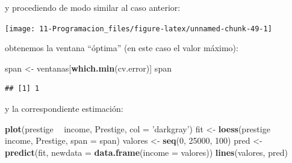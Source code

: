 \documentclass[]{book}
\newenvironment{Shaded}{\begin{snugshade}}{\end{snugshade}}
\newcommand{\KeywordTok}[1]{\textcolor[rgb]{0.13,0.29,0.53}{\textbf{#1}}}
\newcommand{\DataTypeTok}[1]{\textcolor[rgb]{0.13,0.29,0.53}{#1}}
\newcommand{\DecValTok}[1]{\textcolor[rgb]{0.00,0.00,0.81}{#1}}
\newcommand{\FloatTok}[1]{\textcolor[rgb]{0.00,0.00,0.81}{#1}}
\newcommand{\StringTok}[1]{\textcolor[rgb]{0.31,0.60,0.02}{#1}}
\newcommand{\CommentTok}[1]{\textcolor[rgb]{0.56,0.35,0.01}{\textit{#1}}}
\newcommand{\ControlFlowTok}[1]{\textcolor[rgb]{0.13,0.29,0.53}{\textbf{#1}}}
\newcommand{\OperatorTok}[1]{\textcolor[rgb]{0.81,0.36,0.00}{\textbf{#1}}}
\newcommand{\NormalTok}[1]{#1}
\begin{document}
y procediendo de modo similar al caso anterior:

\begin{Shaded}
\end{Shaded}

\begin{center}\texttt{[image: 11-Programacion\_files/figure-latex/unnamed-chunk-49-1]} \end{center}

obtenemos la ventana ``óptima'' (en este caso el valor máximo):

\begin{Shaded}
\begin{Highlighting}[]
\NormalTok{span <-}\StringTok{ }\NormalTok{ventanas[}\KeywordTok{which.min}\NormalTok{(cv.error)]}
\NormalTok{span}
\end{Highlighting}
\end{Shaded}

\begin{verbatim}
## [1] 1
\end{verbatim}

y la correspondiente estimación:

\begin{Shaded}
\begin{Highlighting}[]
\KeywordTok{plot}\NormalTok{(prestige }\OperatorTok{~}\StringTok{ }\NormalTok{income, Prestige, }\DataTypeTok{col =} \StringTok{'darkgray'}\NormalTok{)}
\NormalTok{fit <-}\StringTok{ }\KeywordTok{loess}\NormalTok{(prestige }\OperatorTok{~}\StringTok{ }\NormalTok{income, Prestige, }\DataTypeTok{span =}\NormalTok{ span)}
\NormalTok{valores <-}\StringTok{ }\KeywordTok{seq}\NormalTok{(}\DecValTok{0}\NormalTok{, }\DecValTok{25000}\NormalTok{, }\DecValTok{100}\NormalTok{)}
\NormalTok{pred <-}\StringTok{ }\KeywordTok{predict}\NormalTok{(fit, }\DataTypeTok{newdata =} \KeywordTok{data.frame}\NormalTok{(}\DataTypeTok{income =}\NormalTok{ valores))}
\KeywordTok{lines}\NormalTok{(valores, pred)}
\end{Highlighting}
\end{Shaded}
\end{document}
